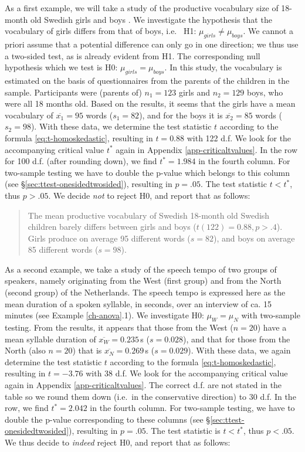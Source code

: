 \documentclass[
]{book}
\begin{document}
As a first example, we will take a study of the productive vocabulary size
of 18-month old Swedish girls and boys \citep{Ande11}. We investigate the hypothesis
that the vocabulary of girls differs from that of boys, i.e.~
H1: \(\mu_{girls} \ne \mu_{boys}\).
We cannot a priori assume that a potential difference can only go in one direction;
we thus use a two-sided test, as is already evident from H1.
The corresponding null hypothesis which we test is H0: \(\mu_{girls} = \mu_{boys}\).
In this study, the vocabulary is estimated on the basis of questionnaires
from the parents of the children in the sample. Participants were
(parents of) \(n_1=123\) girls and \(n_2=129\) boys, who were all 18 months
old. Based on the results, it seems that the girls have a mean vocabulary
of \(\overline{x_1}=95\) words (\(s_1=82\)), and for the boys it is
\(\overline{x_2}=85\) words (\(s_2=98\)). With these data, we determine the
test statistic \(t\) according to the formula
\eqref{eq:t-homoskedastic}, resulting in \(t=0.88\) with 122 d.f. We look for the
accompanying critical value \(t^*\) again in Appendix
\ref{app-criticaltvalues}. In the row for 100 d.f. (after rounding down),
we find \(t^*=1.984\) in the fourth column. For two-sample testing
we have to double the p-value which belongs to this column
(see §\ref{sec:ttest-onesidedtwosided}), resulting in \(p=.05\). The
test statistic \(t < t^*\), thus \(p>.05\). We decide \emph{not} to reject
H0, and report that as follows:

\begin{quote}
The mean productive vocabulary of Swedish 18-month old Swedish children
barely differs between girls and boys
(\(t(122)=0.88, p>.4\)). Girls produce on average 95 different
words (\(s=82\)), and boys on average 85 different words
(\(s=98\)).
\end{quote}

As a second example, we take a study of the speech tempo of two groups
of speakers, namely originating from the West (first group) and
from the North (second group) of the Netherlands. The speech tempo
is expressed here as the mean duration of a spoken syllable, in seconds,
over an interview of ca. 15 minutes (see Example \ref{ch-anova}.1).
We investigate H0: \(\mu_W = \mu_N\) with
two-sample testing. From the results, it appears that those from the West
(\(n=20\)) have a mean syllable duration of
\(\overline{x_W}=0.235\) s (\(s=0.028\)), and that for those from the North (also
\(n=20\)) that is \(\overline{x_N}=0.269\) s (\(s=0.029\)). With these data,
we again determine the test statistic \(t\) according to the formula
\eqref{eq:t-homoskedastic}, resulting in \(t=-3.76\) with 38 d.f. We look for
the accompanying critical value again in Appendix
\ref{app-criticaltvalues}. The correct d.f. are not stated in the table
so we round them down (i.e.~in the conservative direction) to
30 d.f. In the row, we find \(t^*=2.042\) in the fourth column.
For two-sample testing, we have to double the p-value corresponding to
these columns (see
§\ref{sec:ttest-onesidedtwosided}), resulting in \(p=.05\). The
test statistic is \(t < t^*\), thus \(p<.05\). We thus decide
to \emph{indeed} reject H0, and report that as follows:
\end{document}
